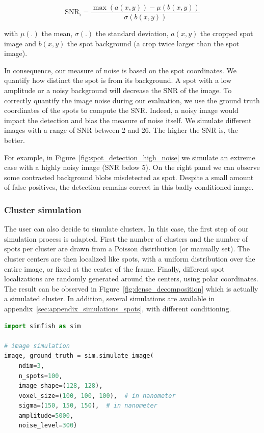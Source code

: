 \begin{equation}
	{\displaystyle \operatorname{SNR_i} = \frac{\max(a(x, y)) - \mu(b(x, y))}{\sigma(b(x, y))}}
\end{equation}

\noindent
with $\mu(.)$ the mean, $\sigma(.)$ the standard deviation, $a(x, y)$ the cropped spot image and $b(x, y)$ the spot background (a crop twice larger than the spot image).

In consequence, our measure of noise is based on the spot coordinates.
We quantify how distinct the spot is from its background.
A spot with a low amplitude or a noisy background will decrease the \ac{SNR} of the image.
To correctly quantify the image noise during our evaluation, we use the ground truth coordinates of the spots to compute the \ac{SNR}.
Indeed, a noisy image would impact the detection and bias the measure of noise itself.
We simulate different images with a range of \ac{SNR} between 2 and 26.
The higher the \ac{SNR} is, the better.

For example, in Figure~\ref{fig:spot_detection_high_noise} we simulate an extreme case with a highly noisy image (\ac{SNR} below 5).
On the right panel we can observe some contrasted background blobs misdetected as spot.
Despite a small amount of false positives, the detection remains correct in this badly conditioned image.

\subsubsection{Cluster simulation}

The user can also decide to simulate clusters.
In this case, the first step of our simulation process is adapted.
First the number of clusters and the number of spots per cluster are drawn from a Poisson distribution (or manually set).
The cluster centers are then localized like spots, with a uniform distribution over the entire image, or fixed at the center of the frame.
Finally, different spot localizations are randomly generated around the centers, using polar coordinates.
The result can be observed in Figure~\ref{fig:dense_decomposition} which is actually a simulated cluster.
In addition, several simulations are available in appendix~\ref{sec:appendix_simulations_spots}, with different conditioning.\\

\begin{minipage}{0.9\textwidth}
\begin{lstlisting}[language=Python]
import simfish as sim

# image simulation
image, ground_truth = sim.simulate_image(
	ndim=3,
	n_spots=100,
	image_shape=(128, 128),
	voxel_size=(100, 100, 100),  # in nanometer
	sigma=(150, 150, 150),  # in nanometer
	amplitude=5000,
	noise_level=300)
\end{lstlisting}
\end{minipage}

